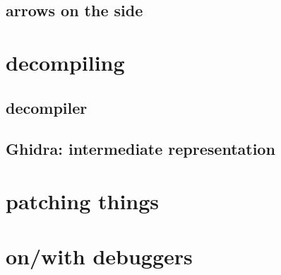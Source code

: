 \subsection{arrows on the side}


\section{decompiling}

\subsection{decompiler}


\subsection{Ghidra: intermediate representation}


\section{patching things}


\section{on/with debuggers}



